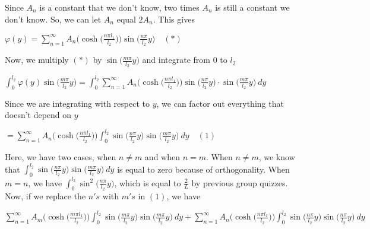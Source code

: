 \documentclass[executivepaper]{article}
\begin{document}
\begin{flushleft}
Since $A_{n}$ is a constant that we don't know, two times $A_{n}$ is still a constant we don't know. So, we can let $A_{n}$ equal $2A_{n}$. This gives

\begin{center}

$\varphi(y)=\sum_{n=1}^{\infty} A_{n} \bigg(\cosh\bigg(\frac{n \pi l_{1}}{l_{2}}\bigg)\bigg) \sin\bigg(\frac{n \pi}{l_{2}} y\bigg) \quad (*)$

\end{center}

Now, we multiply $(*)$ by $\sin\bigg(\frac{m \pi}{l_{2}} y\bigg)$ and integrate from $0$ to $l_{2}$

\begin{center}

$\int_{0}^{l_{2}} \varphi(y) \sin\bigg(\frac{m \pi}{l_{2}} y \bigg)=\int_{0}^{l_{2}} \sum_{n=1}^{\infty} A_{n} \bigg(\cosh\bigg(\frac{n \pi l_{1}}{l_{2}}\bigg)\bigg) \sin\bigg(\frac{n \pi}{l_{2}} y\bigg) \cdot \sin\bigg(\frac{m \pi}{l_{2}} y\bigg) \ dy$

\end{center}

Since we are integrating with respect to $y$, we can factor out everything that doesn't depend on $y$

\begin{center}

$=\sum_{n=1}^{\infty} A_{n} \bigg(\cosh\bigg(\frac{n \pi l_{1}}{l_{2}}\bigg)\bigg) \int_{0}^{l_{2}} \sin\bigg(\frac{n \pi}{l_{2}} y\bigg) \sin\bigg(\frac{m \pi}{l_{2}} y\bigg) \ dy \quad (1)$

\end{center}

Here, we have two cases, when $n \neq m$ and when $n=m$. When $n \neq m$, we know that $\int_{0}^{l_{2}} \sin\bigg(\frac{n \pi}{l_{2}} y\bigg) \sin\bigg(\frac{m \pi}{l_{2}} y\bigg) \ dy$ is equal to zero because of orthogonality. When $m=n$, we have $\int_{0}^{l_{2}} \sin^2\bigg(\frac{n \pi}{l_{2}} y\bigg)$, which is equal to $\frac{2}{L}$ by previous group quizzes. Now, if we replace the $n's$ with $m's$ in $(1)$, we have

\begin{center}

$\sum_{n=1}^{\infty} A_{m} \bigg(\cosh\bigg(\frac{m \pi l_{1}}{l_{2}}\bigg)\bigg) \int_{0}^{l_{2}} \sin\bigg(\frac{m \pi}{l_{2}} y\bigg) \sin\bigg(\frac{m \pi}{l_{2}} y\bigg) \ dy + \sum_{n=1}^{\infty} A_{n} \bigg(\cosh\bigg(\frac{n \pi l_{1}}{l_{2}}\bigg)\bigg) \int_{0}^{l_{2}} \sin\bigg(\frac{n \pi}{l_{2}} y\bigg) \sin\bigg(\frac{n \pi}{l_{2}} y\bigg) \ dy$


\end{center}
\end{flushleft}
\end{document}
